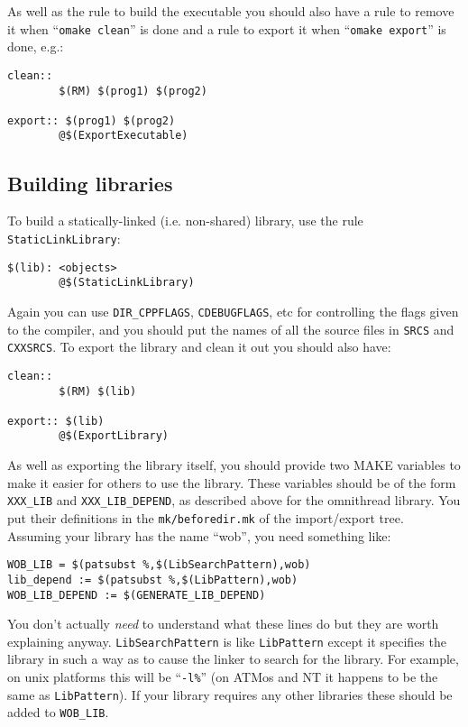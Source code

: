 \documentclass[11pt,twoside,onecolumn]{article}
\begin{document}
As well as the rule to build the executable you should also have a rule to
remove it when ``{\tt omake clean}'' is done and a rule to export it when
``{\tt omake export}'' is done, e.g.:

{\small \begin{verbatim}
clean::
        $(RM) $(prog1) $(prog2)

export:: $(prog1) $(prog2)
        @$(ExportExecutable)
\end{verbatim}}

\subsection{Building libraries}

To build a statically-linked (i.e. non-shared) library, use the rule
{\tt StaticLinkLibrary}:

{\small \begin{verbatim}
$(lib): <objects>
        @$(StaticLinkLibrary)
\end{verbatim}}

Again you can use \verb|DIR_CPPFLAGS|, {\tt CDEBUGFLAGS}, etc for controlling
the flags given to the compiler, and you should put the names of all the source
files in {\tt SRCS} and {\tt CXXSRCS}.  To export the library and clean it out
you should also have:

{\small \begin{verbatim}
clean::
        $(RM) $(lib)

export:: $(lib)
        @$(ExportLibrary)
\end{verbatim}}

As well as exporting the library itself, you should provide two MAKE variables
to make it easier for others to use the library.  These variables should be of
the form \verb|XXX_LIB| and \verb|XXX_LIB_DEPEND|, as described above for the
omnithread library.  You put their definitions in the \verb|mk/beforedir.mk| of
the import/export tree. Assuming your library has the name ``wob'', you need
something like:

{\small \begin{verbatim}
WOB_LIB = $(patsubst %,$(LibSearchPattern),wob)
lib_depend := $(patsubst %,$(LibPattern),wob)
WOB_LIB_DEPEND := $(GENERATE_LIB_DEPEND)
\end{verbatim}}

You don't actually {\em need} to understand what these lines do but they are
worth explaining anyway.  {\tt LibSearchPattern} is like {\tt LibPattern}
except it specifies the library in such a way as to cause the linker to search
for the library.  For example, on unix platforms this will be ``\verb|-l%|''
(on ATMos and NT it happens to be the same as {\tt LibPattern}).  If your
library requires any other libraries these should be added to \verb|WOB_LIB|.
\end{document}
